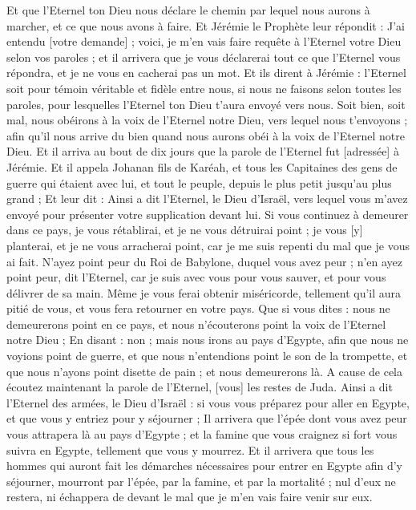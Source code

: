 \begin{multicols}{2}
Et que l'Eternel ton Dieu nous déclare le chemin par lequel nous aurons à marcher, et ce que nous avons à faire.
Et Jérémie le Prophète leur répondit : J'ai entendu [votre demande] ; voici, je m'en vais faire requête à l'Eternel votre Dieu selon vos paroles ; et il arrivera que je vous déclarerai tout ce que l'Eternel vous répondra, et je ne vous en cacherai pas un mot.
Et ils dirent à Jérémie : l'Eternel soit pour témoin véritable et fidèle entre nous, si nous ne faisons selon toutes les paroles, pour lesquelles l'Eternel ton Dieu t'aura envoyé vers nous.
Soit bien, soit mal, nous obéirons à la voix de l'Eternel notre Dieu, vers lequel nous t'envoyons ; afin qu'il nous arrive du bien quand nous aurons obéi à la voix de l'Eternel notre Dieu.
Et il arriva au bout de dix jours que la parole de l'Eternel fut [adressée] à Jérémie.
Et il appela Johanan fils de Karéah, et tous les Capitaines des gens de guerre qui étaient avec lui, et tout le peuple, depuis le plus petit jusqu'au plus grand ;
Et leur dit : Ainsi a dit l'Eternel, le Dieu d'Israël, vers lequel vous m'avez envoyé pour présenter votre supplication devant lui.
Si vous continuez à demeurer dans ce pays, je vous rétablirai, et je ne vous détruirai point ; je vous [y] planterai, et je ne vous arracherai point, car je me suis repenti du mal que je vous ai fait.
N'ayez point peur du Roi de Babylone, duquel vous avez peur ; n'en ayez point peur, dit l'Eternel, car je suis avec vous pour vous sauver, et pour vous délivrer de sa main.
Même je vous ferai obtenir miséricorde, tellement qu'il aura pitié de vous, et vous fera retourner en votre pays.
Que si vous dites : nous ne demeurerons point en ce pays, et nous n'écouterons point la voix de l'Eternel notre Dieu ;
En disant : non ; mais nous irons au pays d'Egypte, afin que nous ne voyions point de guerre, et que nous n'entendions point le son de la trompette, et que nous n'ayons point disette de pain ; et nous demeurerons là.
A cause de cela écoutez maintenant la parole de l'Eternel, [vous] les restes de Juda. Ainsi a dit l'Eternel des armées, le Dieu d'Israël : si vous vous préparez pour aller en Egypte, et que vous y entriez pour y séjourner ;
Il arrivera que l'épée dont vous avez peur vous attrapera là au pays d'Egypte ; et la famine que vous craignez si fort vous suivra en Egypte, tellement que vous y mourrez.
Et il arrivera que tous les hommes qui auront fait les démarches nécessaires pour entrer en Egypte afin d'y séjourner, mourront par l'épée, par la famine, et par la mortalité ; nul d'eux ne restera, ni échappera de devant le mal que je m'en vais faire venir sur eux.

\end{multicols}
